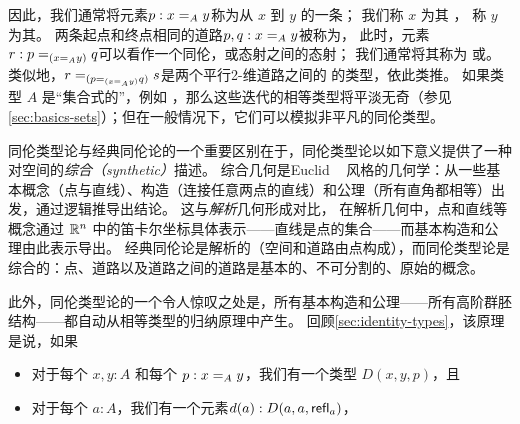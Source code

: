 因此，我们通常将元素$p : \id[A]{x}{y}$称为从 $x$ 到 $y$ 的一条；
我们称 $x$ 为其
，
称 $y$ 为其。
两条起点和终点相同的道路$p,q : \id[A]{x}{y}$被称为，
此时，元素$r : \id[{(\id[A]{x}{y})}]{p}{q}$可以看作一个同伦，或态射之间的态射；
我们通常将其称为
%
或。
%
%
类似地，$\id[{(\id[{(\id[A]{x}{y})}]{p}{q})}]{r}{s}$是两个平行2-维道路之间的
%
的类型，依此类推。
如果类型 $A$ 是``集合式的''，例如 \nat，那么这些迭代的相等类型将平淡无奇（参见\cref{sec:basics-sets}）；但在一般情况下，它们可以模拟非平凡的同伦类型。


同伦类型论与经典同伦论的一个重要区别在于，同伦类型论以如下意义提供了一种对空间的\emph{综合（synthetic）}描述。
%
%
%
综合几何是Euclid ~\cite{Euclid} 风格的几何学：从一些基本概念（点与直线）、构造（连接任意两点的直线）和公理（所有直角都相等）出发，通过逻辑推导出结论。
这与\emph{解析}几何形成对比，
%
在解析几何中，点和直线等概念通过 $\R^n$ 中的笛卡尔坐标具体表示——直线是点的集合——而基本构造和公理由此表示导出。
经典同伦论是解析的（空间和道路由点构成），而同伦类型论是综合的：点、道路以及道路之间的道路是基本的、不可分割的、原始的概念。

此外，同伦类型论的一个令人惊叹之处是，所有基本构造和公理——所有高阶群胚结构——都自动从相等类型的归纳原理中产生。
回顾\cref{sec:identity-types}，该原理是说，如果

\begin{itemize}
\item 对于每个 $x,y:A$ 和每个 $p:\id[A]xy$，我们有一个类型 $D(x,y,p)$，且
\item 对于每个 $a:A$，我们有一个元素$d(a):D(a,a,\refl a)$，
\end{itemize}

